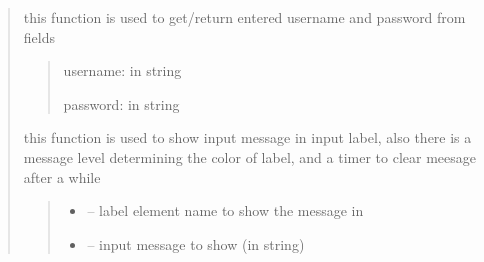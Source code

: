 \documentclass[letterpaper,10pt,english]{sphinxmanual}
\begin{document}
\begin{quote}
\begin{savenotes}
\begin{fulllineitems}
\begin{savenotes}\begin{fulllineitems}
\label{\detokenize{setting/login_UI:oxin.login_UI.UI_main_window.get_user_pass}}
\pysigstartsignatures
{}
\pysigstopsignatures
\sphinxAtStartPar
this function is used to get/return entered username and password from fields
\begin{quote}\begin{description}
\sphinxAtStartPar
username: in string

\sphinxAtStartPar
password: in string

\end{description}\end{quote}

\end{fulllineitems}\end{savenotes}


\begin{savenotes}\begin{fulllineitems}
\label{\detokenize{setting/login_UI:oxin.login_UI.UI_main_window.set_login_message}}
\pysigstartsignatures
{}
\pysigstopsignatures
\sphinxAtStartPar
this function is used to show input message in input label, also there is a message level determining the color of label, and a timer to clear meesage after a while
\begin{quote}\begin{description}
\begin{itemize}
\item {} 
\sphinxAtStartPar
{} – label element name to show the message in

\item {} 
\sphinxAtStartPar
{} – input message to show (in string)


\end{itemize}
\end{description}
\end{quote}
\end{fulllineitems}
\end{savenotes}
\end{fulllineitems}
\end{savenotes}
\end{quote}
\end{document}
